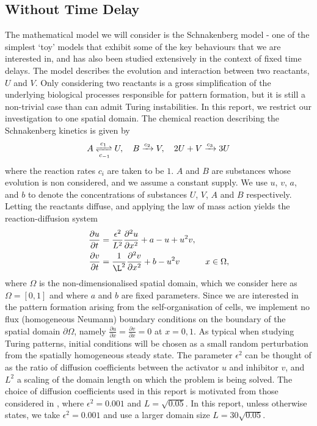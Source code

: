 \subsection{Without Time Delay}
The mathematical model we will consider is the Schnakenberg model \cite{schnakenberg} - one of the simplest `toy' models that exhibit some of the key behaviours that we are interested in, and has also been studied extensively in the context of fixed time delays. The model describes the evolution and interaction between two reactants, $U$ and $V$. Only considering two reactants is a gross simplification of the underlying biological processes responsible for pattern formation, but it is still a non-trivial case than can admit Turing instabilities. In this report, we restrict our investigation to one spatial domain. The chemical reaction describing the Schnakenberg kinetics is given by \cite{baker}
\begin{equation}\label{chem}
A\xrightleftharpoons[c_{-1}]{c_1} U,\quad B\xrightarrow{c_2} V,\quad 2U+V\xrightarrow{c_3} 3U
\end{equation}
where the reaction rates $c_i$ are taken to be $1$. $A$ and $B$ are substances whose evolution is non considered, and we assume a constant supply. We use $u$, $v$, $a$, and $b$ to denote the concentrations of substances $U$, $V$, $A$ and $B$ respectively. Letting the reactants diffuse, and applying the law of mass action yields the reaction-diffusion system
\begin{equation}\label{system}
    \begin{split}
    \frac{\partial u}{\partial t}&=\frac{\epsilon^2}{L^2}\frac{\partial^2 u}{\partial x^2}+a-u+u^2v,\\
    \frac{\partial v}{\partial t}&=\frac{1}{\L^2}\frac{\partial^2 v}{\partial x^2}+b-u^2v \quad\quad\quad x\in\Omega,
    \end{split}
\end{equation}
where $\Omega$ is the non-dimensionalised spatial domain, which we consider here as $\Omega=[0,1]$ and where $a$ and $b$ are fixed parameters. Since we are interested in the pattern formation arising from the self-organisation of cells, we implement no flux (homogeneous Neumann) boundary conditions on the boundary of the spatial domain $\partial\Omega$, namely $\frac{\partial u}{\partial x}=\frac{\partial v}{\partial x}=0$ at $x=0, 1$. As typical when studying Turing patterns, initial conditions will be chosen as a small random perturbation from the spatially homogeneous steady state. The parameter $\epsilon^2$ can be thought of as the ratio of diffusion coefficients between the activator $u$ and inhibitor $v$, and $L^2$ a scaling of the domain length on which the problem is being solved. The choice of diffusion coefficients used in this report is motivated from those considered in \cite{gaffmonk}, where $\epsilon^2=0.001$ and $L=\sqrt{0.05}$. In this report, unless otherwise states, we take $\epsilon^2=0.001$ and use a larger domain size $L=30\sqrt{0.05}$.

